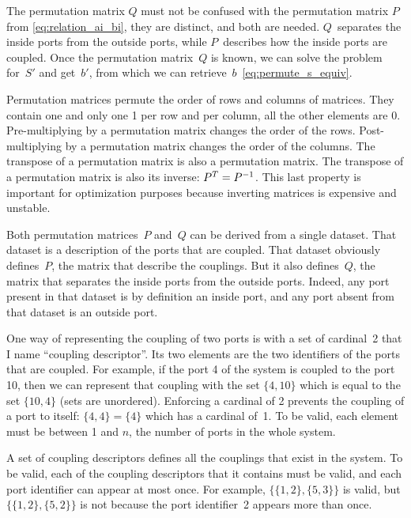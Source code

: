 The permutation matrix $Q$ must not be confused with the permutation matrix $P$ from \cref{eq:relation_ai_bi}, they are distinct, and both are needed.
$Q$~separates the inside ports from the outside ports, while $P$~describes how the inside ports are coupled.
Once the permutation matrix~$Q$ is known, we can solve the problem for~$S'$ and get~$b'$, from which we can retrieve~$b$~\cref{eq:permute_s_equiv}.

Permutation matrices permute the order of rows and columns of matrices.
They contain one and only one 1 per row and per column, all the other elements are 0.
Pre-multiplying by a permutation matrix changes the order of the rows.
Post-multiplying by a permutation matrix changes the order of the columns.
The transpose of a permutation matrix is also a permutation matrix.
The transpose of a permutation matrix is also its inverse: $P^T = P^{-1}$.
This last property is important for optimization purposes because inverting matrices is expensive and unstable.

Both permutation matrices~$P$ and~$Q$ can be derived from a single dataset.
That dataset is a description of the ports that are coupled.
That dataset obviously defines~$P$, the matrix that describe the couplings.
But it also defines~$Q$, the matrix that separates the inside ports from the outside ports.
Indeed, any port present in that dataset is by definition an inside port, and any port absent from that dataset is an outside port.

One way of representing the coupling of two ports is with a set of cardinal~2 that I name ``coupling descriptor''.
Its two elements are the two identifiers of the ports that are coupled.
For example, if the port 4 of the system is coupled to the port 10, then we can represent that coupling with the set $\lbrace 4, 10\rbrace$ which is equal to the set $\lbrace 10, 4\rbrace$ (sets are unordered).
Enforcing a cardinal of 2 prevents the coupling of a port to itself: $\lbrace 4, 4\rbrace = \lbrace 4\rbrace$ which has a cardinal of~1.
To be valid, each element must be between 1 and $n$, the number of ports in the whole system.

A set of coupling descriptors defines all the couplings that exist in the system.
To be valid, each of the coupling descriptors that it contains must be valid, and each port identifier can appear at most once.
For example,
$\lbrace \lbrace 1, 2 \rbrace, \lbrace 5, 3 \rbrace \rbrace$
is valid, but 
$\lbrace \lbrace 1, 2 \rbrace, \lbrace 5, 2 \rbrace \rbrace$
is not because the port identifier~2 appears more than once.

